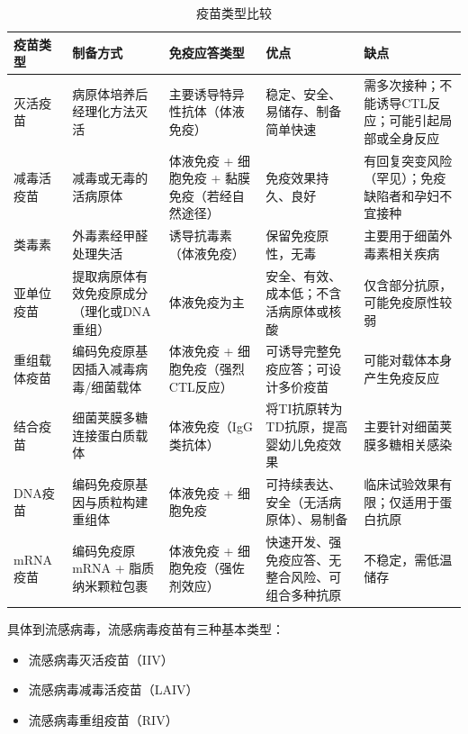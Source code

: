 \documentclass[9pt,a4paper,twoside]{rho-class/rho}
\begin{document}
    \begin{table}[H]
        \centering
        \caption{疫苗类型比较}
        \label{tab:vaccine_comparison}
        \small %
        \begin{tabularx}{\textwidth}{@{}l >{\raggedright\arraybackslash}p{2.5cm} >{\raggedright\arraybackslash}p{2.8cm} >{\raggedright\arraybackslash}X >{\raggedright\arraybackslash}X@{}}
        \toprule
        \textbf{疫苗类型} & \textbf{制备方式} & \textbf{免疫应答类型} & \textbf{优点} & \textbf{缺点} \\
        \midrule
        灭活疫苗 & 病原体培养后经理化方法灭活 & 主要诱导特异性抗体（体液免疫） & 稳定、安全、易储存、制备简单快速 & 需多次接种；不能诱导CTL反应；可能引起局部或全身反应 \\
        \midrule
        减毒活疫苗 & 减毒或无毒的活病原体 & 体液免疫 + 细胞免疫 + 黏膜免疫（若经自然途径） & 免疫效果持久、良好 & 有回复突变风险（罕见）；免疫缺陷者和孕妇不宜接种 \\
        \midrule
        类毒素 & 外毒素经甲醛处理失活 & 诱导抗毒素（体液免疫） & 保留免疫原性，无毒 & 主要用于细菌外毒素相关疾病 \\
        \midrule
        亚单位疫苗 & 提取病原体有效免疫原成分（理化或DNA重组） & 体液免疫为主 & 安全、有效、成本低；不含活病原体或核酸 & 仅含部分抗原，可能免疫原性较弱 \\
        \midrule
        重组载体疫苗 & 编码免疫原基因插入减毒病毒/细菌载体 & 体液免疫 + 细胞免疫（强烈CTL反应） & 可诱导完整免疫应答；可设计多价疫苗 & 可能对载体本身产生免疫反应 \\
        \midrule
        结合疫苗 & 细菌荚膜多糖连接蛋白质载体 & 体液免疫（IgG类抗体） & 将TI抗原转为TD抗原，提高婴幼儿免疫效果 & 主要针对细菌荚膜多糖相关感染 \\
        \midrule
        DNA疫苗 & 编码免疫原基因与质粒构建重组体 & 体液免疫 + 细胞免疫 & 可持续表达、安全（无活病原体）、易制备 & 临床试验效果有限；仅适用于蛋白抗原 \\
        \midrule
        mRNA疫苗 & 编码免疫原mRNA + 脂质纳米颗粒包裹 & 体液免疫 + 细胞免疫（强佐剂效应） & 快速开发、强免疫应答、无整合风险、可组合多种抗原 & 不稳定，需低温储存 \\
        \bottomrule
        \end{tabularx}
    \end{table}

    具体到流感病毒，流感病毒疫苗有三种基本类型：
    \begin{itemize}
        \item 流感病毒灭活疫苗（IIV）
        \item 流感病毒减毒活疫苗（LAIV）
        \item 流感病毒重组疫苗（RIV）
    \end{itemize}
    
\end{document}
